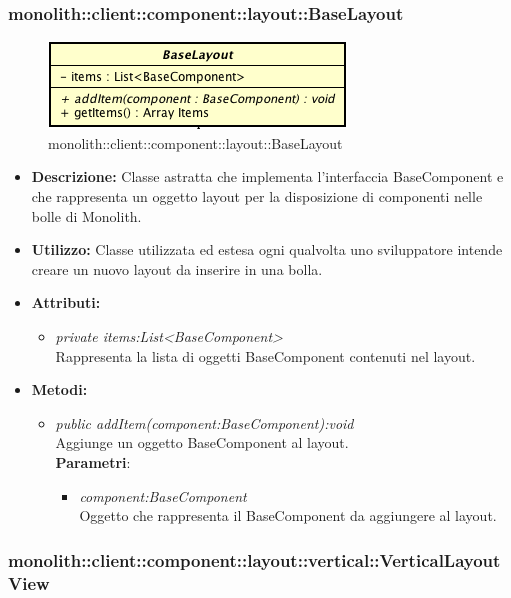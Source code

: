 \subsubsection{monolith::client::component::layout::BaseLayout}

\label{monolith::client::component::layout::BaseLayout}
\begin{figure}[ht]
	\centering
	\includegraphics[scale=0.5]{Sezioni/SottosezioniST/img/BaseLayout.png}
	\caption{monolith::client::component::layout::BaseLayout}
\end{figure}

\begin{itemize}
\item \textbf{Descrizione:} Classe astratta che implementa l'interfaccia BaseComponent e che rappresenta un oggetto layout per la disposizione di componenti nelle bolle di Monolith.
\item \textbf{Utilizzo:} Classe utilizzata ed estesa ogni qualvolta uno sviluppatore intende creare un nuovo layout da inserire in una bolla.
\item \textbf{Attributi:}
\begin{itemize}
\item \textit{private items:List<BaseComponent>}\\
Rappresenta la lista di oggetti BaseComponent contenuti nel layout.
\end{itemize}
\item \textbf{Metodi:}
\begin{itemize}
\item \textit{public addItem(component:BaseComponent):void}\\
Aggiunge un oggetto BaseComponent al layout.
\\ \textbf{Parametri}: \begin{itemize}
\item \textit{component:BaseComponent}\\
Oggetto che rappresenta il BaseComponent da aggiungere al layout.
\end{itemize}
\end{itemize}
\end{itemize}

\subsubsection{monolith::client::component::layout::vertical::VerticalLayoutView}

